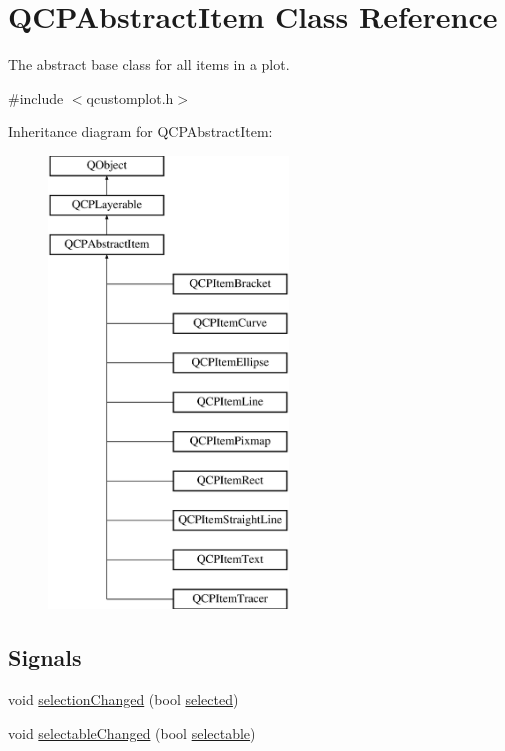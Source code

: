 \hypertarget{class_q_c_p_abstract_item}{}\section{Q\+C\+P\+Abstract\+Item Class Reference}
\label{class_q_c_p_abstract_item}


The abstract base class for all items in a plot.  




{\ttfamily \#include $<$qcustomplot.\+h$>$}

Inheritance diagram for Q\+C\+P\+Abstract\+Item\+:\begin{figure}[H]
\begin{center}
\leavevmode
\includegraphics[height=12.000000cm]{class_q_c_p_abstract_item}
\end{center}
\end{figure}
\subsection*{Signals}
\begin{DoxyCompactItemize}
\item 
void \hyperlink{class_q_c_p_abstract_item_aa5cffb034fc65dbb91c77e02c1c14251}{selection\+Changed} (bool \hyperlink{class_q_c_p_abstract_item_a225865808640d8d9a7dd19f09a2e93f2}{selected})
\item 
void \hyperlink{class_q_c_p_abstract_item_a5b266c11aac61cb511901f3911dac2a3}{selectable\+Changed} (bool \hyperlink{class_q_c_p_abstract_item_a9189e752025533e1595eaade0009a3bc}{selectable})
\end{DoxyCompactItemize}
